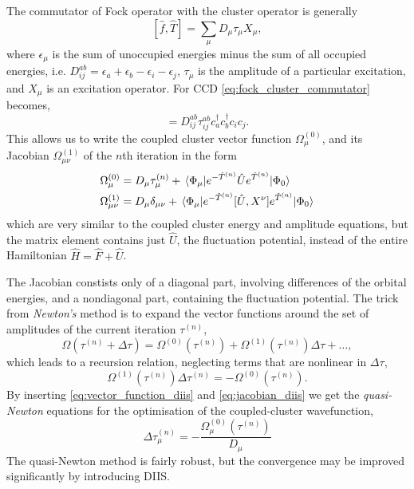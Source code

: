     The commutator of Fock operator with the cluster operator is generally
    \begin{equation}
        \label{eq:fock_cluster_commutator}
        [\hat{f}, \hat{T}] = \sum_\mu D_\mu \tau_\mu X_\mu,
    \end{equation}
    where $\epsilon_\mu$ is the sum of unoccupied energies minus the sum of all 
    occupied energies, i.e. $D^{ab}_{ij} = \epsilon_a  + \epsilon_b - \epsilon_i - \epsilon_j$,
    $\tau_\mu$ is the amplitude of a particular excitation, and $X_\mu$ is an excitation 
    operator. For CCD \autoref{eq:fock_cluster_commutator} becomes,
    \begin{equation}
        [\hat{f}, \hat{T}_2] = D^{ab}_{ij} \tau^{ab}_{ij} c^\dagger_a c^\dagger_b c_i c_j.
    \end{equation}
    This allows us to write the coupled cluster vector function $\Omega^{(0)}_\mu$,
    and its Jacobian $\Omega^{(1)}_{\mu\nu}$ of the $n$th iteration in the form 
    \begin{align}
        \label{eq:vector_function_diis}
        \Omega^{(0)}_\mu &= D_\mu \tau^{(n)}_\mu 
            + \mel{\Phi_\mu}
            {e^{-\hat{T}^{(n)}} \hat{U} e^{\hat{T}^{(n)}}}
            {\Phi_0} \\
        \label{eq:jacobian_diis}
        \Omega^{(1)}_{\mu\nu} &= D_\mu\delta_{\mu\nu} 
            + \mel{\Phi_\mu}
            {e^{-\hat{T}^{(n)}} [\hat{U}, X^\nu] e^{\hat{T}^{(n)}}}
            {\Phi_0}
    \end{align}
    which are very similar to the coupled cluster energy and amplitude equations, but 
    the matrix element contains just $\hat{U}$, the fluctuation potential, instead of 
    the entire Hamiltonian $\hat{H} = \hat{F} + \hat{U}$.

    The Jacobian constists only of a diagonal part, involving differences of the 
    orbital energies, and a nondiagonal part, containing the fluctuation potential.
    The trick from \emph{Newton's} method is to expand the vector functions around 
    the set of amplitudes of the current iteration $\tau^{(n)}$,
    \begin{equation}
        \Omega(\tau^{(n)} + \Delta\tau) = \Omega^{(0)}(\tau^{(n)})
            + \Omega^{(1)}(\tau^{(n)})\Delta \tau + \dots,
    \end{equation}
    which leads to a recursion relation, neglecting terms that are nonlinear in
    $\Delta \tau$,
    \begin{equation}
        \Omega^{(1)}(\tau^{(n)})\Delta \tau^{(n)} = - \Omega^{(0)}(\tau^{(n)}).
    \end{equation}
    By inserting \autoref{eq:vector_function_diis} and \autoref{eq:jacobian_diis} 
    we get the \emph{quasi-Newton} equations for the optimisation of the 
    coupled-cluster wavefunction,
    \begin{equation}
        \label{eq:quasi_newton}
        \Delta \tau^{(n)}_\mu = - \frac{\Omega^{(0)}_\mu(\tau^{(n)})}{D_\mu}
    \end{equation}
    The quasi-Newton method is fairly robust, but the convergence may be improved 
    significantly by introducing DIIS.

